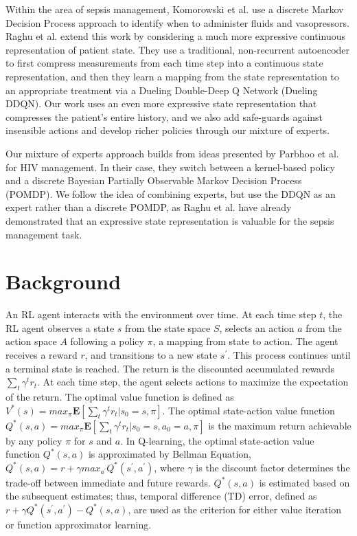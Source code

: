\documentclass[10pt]{amia}
\begin{document}
Within the area of sepsis management, Komorowski et al.\cite{komorowski2016markov} use a discrete Markov Decision Process approach to identify when to administer fluids and vasopressors.  Raghu et al.\cite{DBLP:journals/corr/RaghuKCSG17} extend this work by considering a much more expressive continuous representation of patient state.  They use a traditional, non-recurrent autoencoder to first compress measurements from each time step into a continuous state representation, and then they learn a mapping from the state representation to an appropriate treatment via a Dueling Double-Deep Q Network (Dueling DDQN).  Our work uses an even more expressive state representation that compresses the patient's entire history, and we also add safe-guards against insensible actions and develop richer policies through our mixture of experts.

Our mixture of experts approach builds from ideas presented by Parbhoo et al.\cite{parbhoo2017combining} for HIV management.  In their case, they switch between a kernel-based policy and a discrete Bayesian Partially Observable Markov Decision Process (POMDP). We follow the idea of combining experts, but use the DDQN as an expert rather than a discrete POMDP, as Raghu et al.\cite{DBLP:journals/corr/RaghuKCSG17} have already demonstrated that an expressive state representation is valuable for the sepsis management task.

\section*{Background}

An RL agent interacts with the environment over time. At each time step $t$, the RL agent observes a state $s$ from the state space $S$, selects an action $a$ from the action space $A$ following a policy $\pi$, a mapping from state to action. The agent receives a reward $r$, and transitions to a new state $s^\prime$. This process continues until a terminal state is reached. The return is the discounted accumulated rewards $\sum_t \gamma^t r_t$. At each time step, the agent selects actions to maximize the expectation of the return. The optimal value function is defined as $V^{*}(s)=max_{\pi}\textbf{E} [\sum_t \gamma^t r_t|s_0=s, \pi]$. The optimal state-action value function $Q^{*}(s,a)=max_{\pi}\textbf{E} [\sum_t \gamma^t r_t|s_0 = s,a_0 = a,\pi]$ is the maximum return achievable by any policy $\pi$ for $s$ and $a$.  In Q-learning, the optimal state-action value function $Q^{*}(s,a)$ is approximated by Bellman Equation, $Q^{*}(s,a)= r+\gamma max_{a^{'}} Q^{*}(s^{'},a^{'})$, where $\gamma$ is the discount factor determines the trade-off between immediate and future rewards. $Q^{*}(s,a)$ is estimated based on the subsequent estimates; thus, temporal difference (TD) error, defined as $r + \gamma Q^{*}(s^{'}, a^{'}) - Q^{*}(s,a)$, are used as the criterion for either value iteration or function approximator learning. 
\end{document}
